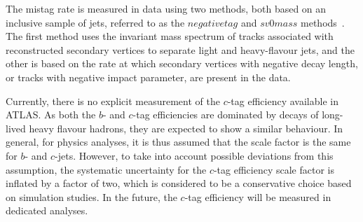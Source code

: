 The mistag rate is measured in data using two methods, both based on an inclusive sample of jets, referred to as the $negative tag$ and $sv0mass$ methods~\cite{ATLAS-CONF-2012-040}. The first method uses the invariant mass spectrum of tracks associated with reconstructed secondary vertices to separate light and heavy-flavour jets, and the other is based on the rate at which secondary vertices with negative decay length, or tracks with negative impact parameter, are present in the data.


Currently, there is no explicit measurement of the $c$-tag efficiency available in ATLAS. As both the
$b$- and $c$-tag efficiencies are dominated by decays of long-lived heavy flavour hadrons, they are expected to show a similar behaviour. In general, for physics analyses, it is thus assumed that the scale factor is the same for $b$- and $c$-jets. However, to take into account possible deviations from this assumption, the systematic uncertainty for the $c$-tag efficiency scale factor is inflated by a factor of two, which is considered to be a conservative choice based on simulation studies. In the future, the $c$-tag efficiency will be measured in dedicated analyses.



